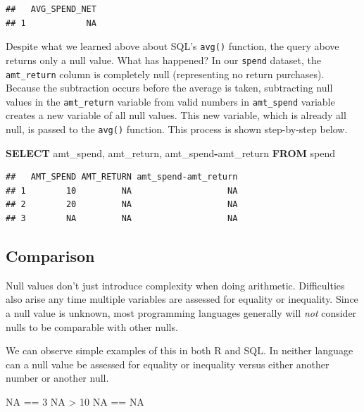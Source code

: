\documentclass[
]{krantz}
\makeatletter
\newenvironment{Shaded}{\begin{snugshade}}{\end{snugshade}}
\newcommand{\ConstantTok}[1]{\textcolor[rgb]{0,0,0}{#1}}
\newcommand{\DecValTok}[1]{\textcolor[rgb]{0.06,0.06,0.06}{#1}}
\newcommand{\KeywordTok}[1]{\textcolor[rgb]{0.27,0.27,0.27}{\textbf{#1}}}
\newcommand{\NormalTok}[1]{#1}
\newcommand{\OperatorTok}[1]{\textcolor[rgb]{0.43,0.43,0.43}{\textbf{#1}}}
\newcommand{\SpecialCharTok}[1]{\textcolor[rgb]{0,0,0}{#1}}
\newenvironment{kframe}{%
\medskip{}
\setlength{\fboxsep}{.8em}
 \def\at@end@of@kframe{}%
 \ifinner\ifhmode%
  \def\at@end@of@kframe{\end{minipage}}%
  \begin{minipage}{\columnwidth}%
 \fi\fi%
 \def\FrameCommand##1{\hskip\@totalleftmargin \hskip-\fboxsep
 \colorbox{shadecolor}{##1}\hskip-\fboxsep
     \hskip-\linewidth \hskip-\@totalleftmargin \hskip\columnwidth}%
 \MakeFramed {\advance\hsize-\width
   \@totalleftmargin\z@ \linewidth\hsize
   \@setminipage}}%
 {\par\unskip\endMakeFramed%
 \at@end@of@kframe}
\renewenvironment{Shaded}{\begin{kframe}}{\end{kframe}}
\makeatother
\begin{document}
\begin{verbatim}
##   AVG_SPEND_NET
## 1            NA
\end{verbatim}

Despite what we learned above about SQL's \texttt{avg()} function, the query above returns only a null value.
What has happened?
In our \texttt{spend} dataset, the \texttt{amt\_return} column is completely null (representing no return purchases).
Because the subtraction occurs before the average is taken, subtracting null values in the \texttt{amt\_return} variable from valid numbers in \texttt{amt\_spend} variable creates a new variable of all null values.
This new variable, which is already all null, is passed to the \texttt{avg()} function.
This process is shown step-by-step below.

\begin{Shaded}
\begin{Highlighting}[]
\KeywordTok{SELECT}
\NormalTok{  amt\_spend, }
\NormalTok{  amt\_return, }
\NormalTok{  amt\_spend}\OperatorTok{{-}}\NormalTok{amt\_return }
\KeywordTok{FROM}\NormalTok{ spend}
\end{Highlighting}
\end{Shaded}

\begin{verbatim}
##   AMT_SPEND AMT_RETURN amt_spend-amt_return
## 1        10         NA                   NA
## 2        20         NA                   NA
## 3        NA         NA                   NA
\end{verbatim}

\hypertarget{comparison}{%
\subsection{Comparison}\label{comparison}}

Null values don't just introduce complexity when doing arithmetic.
Difficulties also arise any time multiple variables are assessed for equality or inequality.
Since a null value is unknown, most programming languages generally will \emph{not} consider nulls to be comparable with other nulls.

We can observe simple examples of this in both R and SQL. In neither language can a null value be assessed for equality or inequality versus either another number or another null.

\begin{Shaded}
\begin{Highlighting}[]
\ConstantTok{NA} \SpecialCharTok{==} \DecValTok{3} 
\ConstantTok{NA} \SpecialCharTok{\textgreater{}} \DecValTok{10} 
\ConstantTok{NA} \SpecialCharTok{==} \ConstantTok{NA}
\end{Highlighting}
\end{Shaded}
\end{document}

